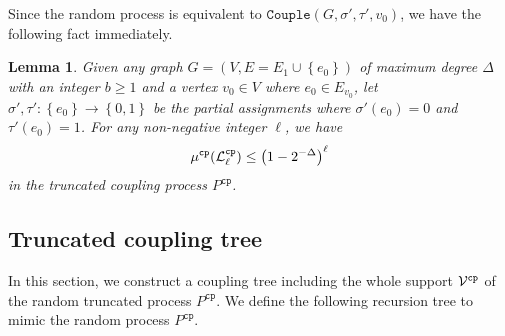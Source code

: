 \documentclass[11pt]{article}
\newtheorem{lemma}[theorem]{Lemma}
\newcommand{\set}[1]{\left\{#1\right\}}
\def\!#1{\mathtt{#1}}
\newcommand{\qgl}[1]{{\color{purple}{#1}}}
\begin{document}
    
    Since the random process is equivalent to $\!{Couple}(G,\sigma',\tau',v_0)$, we have the following fact immediately.

    \begin{lemma}\label{lem:random-process-decay}
        Given any graph $G=(V,E=E_1\cup \set{e_0})$ of maximum degree $\Delta$ with an integer $b\geq 1$ and a vertex $v_0\in V$ where $e_0\in E_{v_0}$, let $\sigma',\tau': \set{e_0}\rightarrow \set{0,1}$ be the partial assignments where $\sigma'(e_0)=0$ and $\tau'(e_0)=1$. For any non-negative integer $\ell$, we have
        \begin{align*}
            \mu^{\!{cp}}(\+L_\ell^{\!{cp}})\leq \left(1-{2^{-\Delta}}\right)^{\ell}
        \end{align*}
        in the truncated coupling process $P^{\!{cp}}$.
    \end{lemma}

\subsection{Truncated coupling tree}
    In this section, we construct a coupling tree including the whole support $\+V^{\!{cp}}$ of the random truncated process $P^{\!{cp}}$. \qgl{add more words here. This is the best we can expect since we can not simulate the random process faithfully.}
    We define the following recursion tree to mimic the random process $P^{\!{cp}}$.
\end{document}
